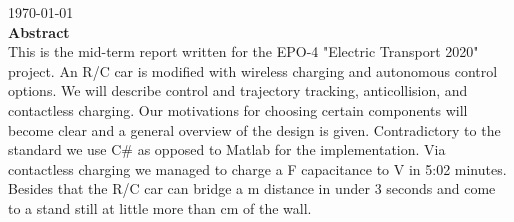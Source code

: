 \documentclass[12pt]{scrreprt}
\begin{document}
\begin{titlepage}


{\large \today}\\ [1.5cm]


 
% 

\textbf{Abstract} \\ 
This is the mid-term report written for the EPO-4 "Electric Transport 2020" project. 
An R/C car is modified with wireless charging and autonomous control options. 
We will describe control and trajectory tracking, anticollision, and contactless charging. 
Our motivations for choosing certain components will become clear and a general overview of the design is given. 
Contradictory to the standard we use C\# as opposed to Matlab for the implementation. 
Via contactless charging we managed to charge a \unit[35]{F} capacitance to \unit[20]{V} in 5:02 minutes. 
Besides that the R/C car can bridge a \unit[3]{m} distance in under 3 seconds and come to a stand still at little more than \unit[10]{cm} of the wall.

\vfill %

\end{titlepage}
\end{document}
